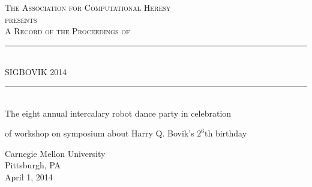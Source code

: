\documentclass{article}
\begin{document}
\setmainfont{Rumsey}
\setsansfont{Birbaslo}

\newcommand{\HRule}{\rule{\linewidth}{0.5mm}}

\begin{titlepage}
\begin{center}

\textsc{\LARGE The Association for Computational Heresy}\\[0.5cm]

\textsc{\large presents}\\[1cm]

\textsc{\Large A Record of the Proceedings of}\\[0.5cm]
\HRule \\[0.4cm]
{ \Huge \sf SIGBOVIK 2014 \\[0.4cm] }

\HRule \\[2cm]


The eight annual intercalary robot dance party in celebration

of workshop on symposium about Harry Q. Bovik's $2^6$th birthday

\vfill

{\Large Carnegie Mellon University\\[0.25cm]
Pittsburgh, PA\\[0.3cm]
April 1, 2014}

\end{center}
\end{titlepage}
\end{document}
